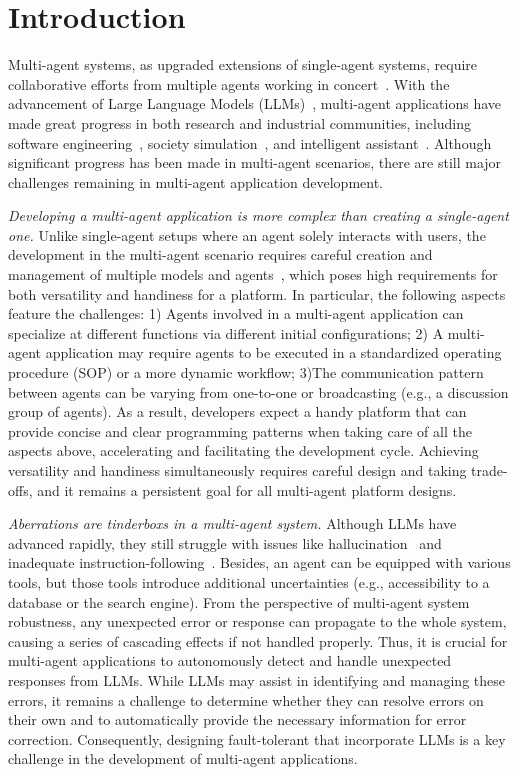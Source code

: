 \section{Introduction}
Multi-agent systems, as upgraded extensions of single-agent systems, require collaborative efforts from multiple agents working in concert~\citep{agent-survey-1, agent-survey-2}. 
With the advancement of Large Language Models (LLMs)~\citep{instructGPT, gpt-4, llama, llama2}, multi-agent applications have made great progress in both research and industrial communities, including software engineering~\citep{meta-gpt}, society simulation~\citep{aitown}, and intelligent assistant~\citep{auto-gen, autogpt}.
Although significant progress has been made in multi-agent scenarios, there are still major challenges remaining in multi-agent application development.  

\textit{Developing a multi-agent application is more complex than creating a single-agent one.}
Unlike single-agent setups where an agent solely interacts with users, the development in the multi-agent scenario requires careful creation and management of multiple models and agents~\citep{agent-survey-1, agent-survey-2}, which poses high requirements for both versatility and handiness for a platform.
In particular, the following aspects feature the challenges: 1) Agents involved in a multi-agent application can specialize at different functions via different initial configurations; 2) A multi-agent application may require agents to be executed in a standardized operating procedure (SOP) or a more dynamic workflow; 3)The communication pattern between agents can be varying from one-to-one or broadcasting (e.g., a discussion group of agents).
As a result, developers expect a handy platform that can provide concise and clear programming patterns when taking care of all the aspects above, accelerating and facilitating the development cycle.
Achieving versatility and handiness simultaneously requires careful design and taking trade-offs, and it remains a persistent goal for all multi-agent platform designs.

\textit{Aberrations are tinderboxs in a multi-agent system.}
Although LLMs have advanced rapidly, they still struggle with issues like hallucination~\citep{hall1, hall2} and inadequate instruction-following~\citep{follow1, follow2}.
Besides, an agent can be equipped with various tools, but those tools introduce additional uncertainties (e.g., accessibility to a database or the search engine).
From the perspective of multi-agent system robustness, any unexpected error or response can propagate to the whole system, causing a series of cascading effects if not handled properly.
Thus, it is crucial for multi-agent applications to autonomously detect and handle unexpected responses from LLMs. 
While LLMs may assist in identifying and managing these errors, it remains a challenge to determine whether they can resolve errors on their own and to automatically provide the necessary information for error correction. 
Consequently, designing fault-tolerant that incorporate LLMs is a key challenge in the development of multi-agent applications. 

